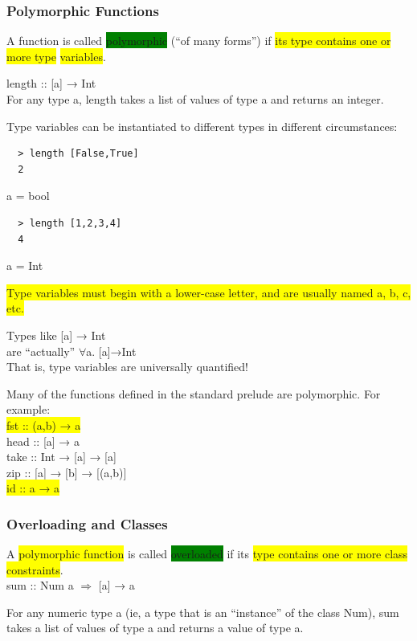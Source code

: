 \documentclass[tikz,border=10pt]{project_plan}
\begin{document}
\subsubsection{Polymorphic Functions}

A function is called \colorbox{green}{polymorphic} (“of many forms”) if \colorbox{yellow}{its
  type contains one or more type} \colorbox{yellow}{variables}.

length :: [a] → Int\\
For any type a, length takes a list of values of type a
and returns an integer.

Type variables can be instantiated to different types in
different circumstances:\\
\begin{lstlisting}
  > length [False,True]
  2
\end{lstlisting}
a = bool
\begin{lstlisting}
  > length [1,2,3,4]
  4
\end{lstlisting}
a = Int

\colorbox{yellow}{Type variables must begin with a lower-case letter, and
  are usually named a, b, c, etc.}

Types like [a] → Int\\
are “actually” $\forall$a. [a]→Int\\
That is, type variables are universally quantified!

Many of the functions defined in the standard prelude
are polymorphic. For example:\\
\colorbox{yellow}{fst :: (a,b) → a}\\
head :: [a] → a\\
take :: Int → [a] → [a]\\
zip :: [a] → [b] → [(a,b)]\\
\colorbox{yellow}{id :: a → a}

\subsubsection{Overloading and Classes}

A \colorbox{yellow}{polymorphic function} is called \colorbox{green}{overloaded} if its \colorbox{yellow}{type
  contains one or more class constraints}.\\
sum :: Num a $\Rightarrow$ [a] → a

For any numeric type a (ie, a type that is an
“instance” of the class Num), sum takes a list of
values of type a and returns a value of type a.
\end{document}
